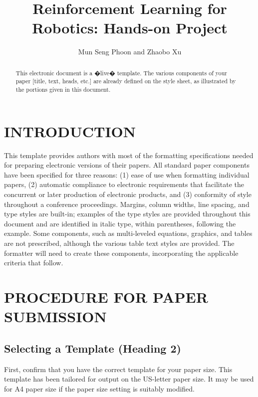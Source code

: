 \documentclass[letterpaper, 10 pt, conference]{ieeeconf}  %
\title{\LARGE \bf
Reinforcement Learning for Robotics: Hands-on Project
}
\author{Mun Seng Phoon and Zhaobo Xu}%
\begin{document}
\maketitle
\thispagestyle{empty}
\pagestyle{empty}


\begin{abstract}

This electronic document is a �live� template. The various components of your paper [title, text, heads, etc.] are already defined on the style sheet, as illustrated by the portions given in this document.

\end{abstract}


\section{INTRODUCTION}

This template provides authors with most of the formatting specifications needed for preparing electronic versions of their papers. All standard paper components have been specified for three reasons: (1) ease of use when formatting individual papers, (2) automatic compliance to electronic requirements that facilitate the concurrent or later production of electronic products, and (3) conformity of style throughout a conference proceedings. Margins, column widths, line spacing, and type styles are built-in; examples of the type styles are provided throughout this document and are identified in italic type, within parentheses, following the example. Some components, such as multi-leveled equations, graphics, and tables are not prescribed, although the various table text styles are provided. The formatter will need to create these components, incorporating the applicable criteria that follow.

\section{PROCEDURE FOR PAPER SUBMISSION}

\subsection{Selecting a Template (Heading 2)}

First, confirm that you have the correct template for your paper size. This template has been tailored for output on the US-letter paper size. 
It may be used for A4 paper size if the paper size setting is suitably modified.
\end{document}
